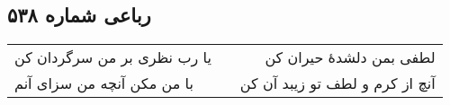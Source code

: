 \begin{center}
\section*{رباعی شماره ۵۳۸}
\label{sec:sh538}
\begin{longtable}{l p{0.5cm} r}
یا رب نظری بر من سرگردان کن
&&
لطفی بمن دلشدهٔ حیران کن
\\
با من مکن آنچه من سزای آنم
&&
آنچ از کرم و لطف تو زیبد آن کن
\\
\end{longtable}
\end{center}
